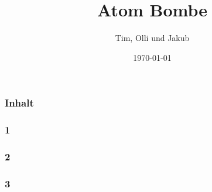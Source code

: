 \documentclass{beamer}
\title{Atom Bombe}
\author{Tim, Olli und Jakub}
\institute{Kanti Baden}
\date{\today}
\begin{document}
    
\begin{frame}
\titlepage
\end{frame}

\begin{frame}
\frametitle{Inhalt}
\end{frame}

\begin{frame}
\frametitle{1}
\end{frame}

\begin{frame}
\frametitle{2}
\end{frame}

\begin{frame}
\frametitle{3}
\end{frame}
\end{document}
